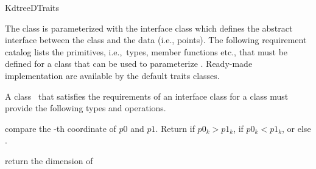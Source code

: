 \begin{ccRefConcept}{KdtreeDTraits}

The   class is  parameterized with the
interface class  which defines the abstract interface
between the  class and the data (i.e., points). The following
requirement catalog lists the primitives, i.e.,~types, member functions
etc., that must be defined for a class that can be used to
parameterize \kdts. Ready-made implementation are available
by the  default traits classes.

\ccTwo{}{\hspace*{7.1cm}}




    \ccDefinition
    A class \ccClassName\ that satisfies the requirements of an
    interface class for a  class must provide the
    following types and operations. 
  
    \ccTypes
    

    \ccOperations

     {compare the -th coordinate
       of $p0$ and $p1$.  Return  if $p0_k >
       p1_k$,  if $p0_k < p1_k$, or else
       .  }


    {return the dimension of }
\end{ccRefConcept}
